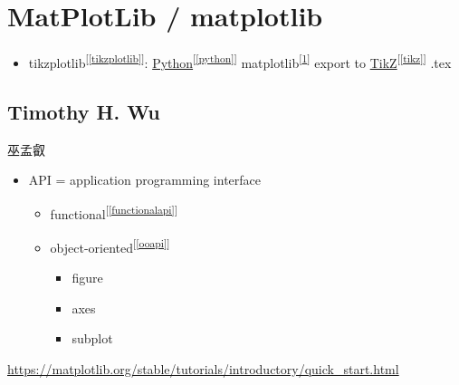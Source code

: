 \documentclass[
]{book}
\providecommand{\tightlist}{%
  \setlength{\itemsep}{0pt}\setlength{\parskip}{0pt}}
\theoremstyle{definition}
\theoremstyle{definition}
\theoremstyle{definition}
\theoremstyle{definition}
\theoremstyle{remark}
\begin{document}
\chapter{MatPlotLib / matplotlib}\label{matplotlib}

\begin{itemize}
\tightlist
\item
  tikzplotlib\textsuperscript{{[}\ref{tikzplotlib}{]}}: \hyperref[python]{Python}\textsuperscript{{[}\ref{python}{]}} matplotlib\textsuperscript{{[}\ref{matplotlib}{]}} export to \hyperref[tikz]{TikZ}\textsuperscript{{[}\ref{tikz}{]}} .tex
\end{itemize}

\section{Timothy H. Wu}\label{timothy-h.-wu}

\begin{CJK}{UTF8}{bsmi}
巫孟叡
\end{CJK}

\begin{itemize}
\tightlist
\item
  API = application programming interface

  \begin{itemize}
  \tightlist
  \item
    functional\textsuperscript{{[}\ref{functionalapi}{]}}
  \item
    object-oriented\textsuperscript{{[}\ref{ooapi}{]}}

    \begin{itemize}
    \tightlist
    \item
      figure
    \item
      axes
    \item
      subplot
    \end{itemize}
  \end{itemize}
\end{itemize}

\url{https://matplotlib.org/stable/tutorials/introductory/quick_start.html}
\end{document}
